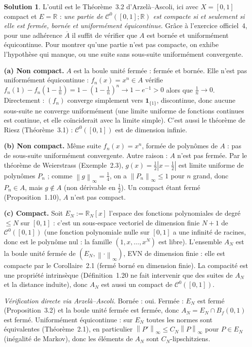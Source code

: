 \documentclass[11pt,a4paper]{article}
\newcommand{\R}{\mathbb{R}}
\newcommand{\adh}[1]{\overline{#1}}
\newcommand{\Bf}{B_f}
\newcommand{\norm}[1]{\left\|#1\right\|}
\newcommand{\Cz}{\mathcal{C}^0}
\theoremstyle{definition}
\newtheorem*{solution}{Solution}
\begin{document}
\begin{solution}
L'outil est le Théorème~3.2 d'Arzelà--Ascoli, ici avec $X=[0,1]$ compact et $E=\R$ : \emph{une partie de $\Cz([0,1];\R)$ est compacte si et seulement si elle est fermée, bornée et uniformément équicontinue}. Grâce à l'exercice officiel~4, pour une adhérence $\adh A$ il suffit de vérifier que $A$ est bornée et uniformément équicontinue. Pour montrer qu'une partie n'est pas compacte, on exhibe l'hypothèse qui manque, ou une suite sans sous-suite uniformément convergente.

\medskip
\noindent\textbf{(a) Non compact.} $A$ est la boule unité fermée : fermée et bornée. Elle n'est pas uniformément équicontinue : $f_n(x)=x^n\in A$ vérifie $f_n(1)-f_n(1-\frac1n)=1-(1-\frac1n)^n\to1-e^{-1}>0$ alors que $\frac1n\to0$. Directement : $(f_n)$ converge simplement vers $\mathbf 1_{\{1\}}$, discontinue, donc aucune sous-suite ne converge uniformément (une limite uniforme de fonctions continues est continue, et elle coïnciderait avec la limite simple). C'est aussi le théorème de Riesz (Théorème~3.1) : $\Cz([0,1])$ est de dimension infinie.

\medskip
\noindent\textbf{(b) Non compact.} Même suite $f_n(x)=x^n$, formée de polynômes de $A$ : pas de sous-suite uniformément convergente. Autre raison : $A$ n'est pas fermée. Par le théorème de Weierstrass (Exemple~2.3), $g(x)=\frac12|x-\frac12|$ est limite uniforme de polynômes $P_n$ ; comme $\norm g_\infty=\frac14$, on a $\norm{P_n}_\infty\le1$ pour $n$ grand, donc $P_n\in A$, mais $g\notin A$ (non dérivable en $\frac12$). Un compact étant fermé (Proposition~1.10), $A$ n'est pas compact.

\medskip
\noindent\textbf{(c) Compact.} Soit $E_N:=\R_N[x]$ l'espace des fonctions polynomiales de degré $\le N$ sur $[0,1]$ : c'est un sous-espace vectoriel de dimension finie $N+1$ de $\Cz([0,1])$ (une fonction polynomiale nulle sur $[0,1]$ a une infinité de racines, donc est le polynôme nul : la famille $(1,x,\dots,x^N)$ est libre). L'ensemble $A_N$ est la boule unité fermée de $(E_N,\norm\cdot_\infty)$, EVN de dimension finie : elle est compacte par le Corollaire~2.1 (fermé borné en dimension finie). La compacité est une propriété intrinsèque (Définition~1.20 ne fait intervenir que des suites de $A_N$ et la distance induite), donc $A_N$ est aussi un compact de $\Cz([0,1])$.

\emph{Vérification directe via Arzelà--Ascoli.} Bornée : oui. Fermée : $E_N$ est fermé (Proposition~3.2) et la boule unité fermée est fermée, donc $A_N=E_N\cap\Bf(0,1)$ est fermé. Uniformément équicontinue : sur $E_N$ toutes les normes sont équivalentes (Théorème~2.1), en particulier $\norm{P'}_\infty\le C_N\norm P_\infty$ pour $P\in E_N$ (inégalité de Markov), donc les éléments de $A_N$ sont $C_N$-lipschitziens.


\end{solution}
\end{document}
